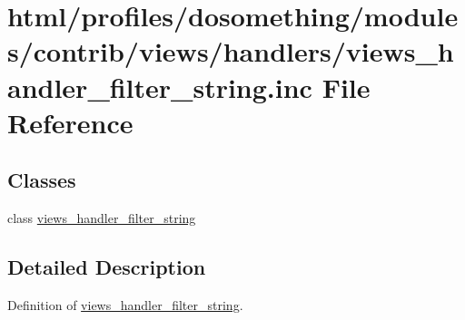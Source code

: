 \hypertarget{views__handler__filter__string_8inc}{
\section{html/profiles/dosomething/modules/contrib/views/handlers/views\_\-handler\_\-filter\_\-string.inc File Reference}
\label{views__handler__filter__string_8inc}
}
\subsection*{Classes}
\begin{DoxyCompactItemize}
\item 
class \hyperlink{classviews__handler__filter__string}{views\_\-handler\_\-filter\_\-string}
\end{DoxyCompactItemize}


\subsection{Detailed Description}
Definition of \hyperlink{classviews__handler__filter__string}{views\_\-handler\_\-filter\_\-string}. 